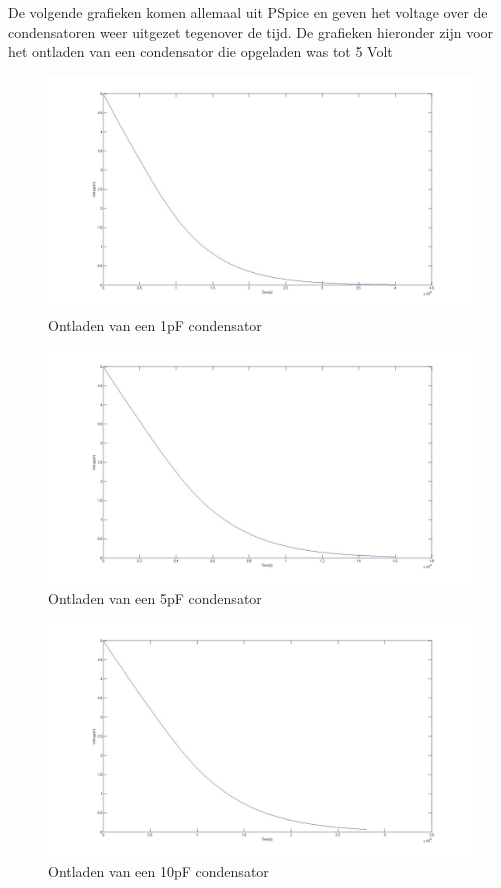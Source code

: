 \documentclass{article}
\begin{document}
De volgende grafieken komen allemaal uit PSpice en geven het voltage over de condensatoren weer uitgezet tegenover de tijd. De grafieken hieronder zijn voor het ontladen van een condensator die opgeladen was tot 5 Volt

\begin{figure}[H]
	\centering
	\includegraphics[scale=0.2]{figures/c1pontladen}
	\caption{Ontladen van een 1pF condensator}
\end{figure}

\begin{figure}[H]
	\centering
	\includegraphics[scale=0.2]{figures/c5pontladen}
	\caption{Ontladen van een 5pF condensator}
\end{figure}

\begin{figure}[H]
	\centering
	\includegraphics[scale=0.2]{figures/c10pontladen}
	\caption{Ontladen van een 10pF condensator}
\end{figure}
\end{document}
